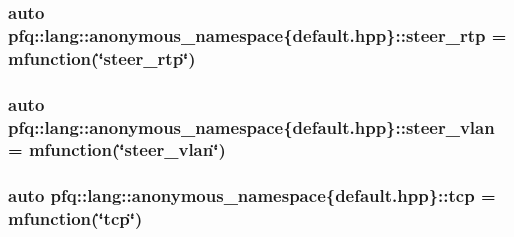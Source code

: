 \hypertarget{namespacepfq_1_1lang_1_1anonymous__namespace_02default_8hpp_03_ac3bc5ec07d93fa5d9266e0e08191fe22}{
\subsubsection[{steer\+\_\+rtp}]{\setlength{\rightskip}{0pt plus 5cm}auto pfq\+::lang\+::anonymous\+\_\+namespace\{default.\+hpp\}\+::steer\+\_\+rtp = {\bf mfunction}(\char`\"{}steer\+\_\+rtp\char`\"{})}}\label{namespacepfq_1_1lang_1_1anonymous__namespace_02default_8hpp_03_ac3bc5ec07d93fa5d9266e0e08191fe22}
\hypertarget{namespacepfq_1_1lang_1_1anonymous__namespace_02default_8hpp_03_a2c6a8ad5a3ae8b60a6a3d18a510f22ac}{
\subsubsection[{steer\+\_\+vlan}]{\setlength{\rightskip}{0pt plus 5cm}auto pfq\+::lang\+::anonymous\+\_\+namespace\{default.\+hpp\}\+::steer\+\_\+vlan = {\bf mfunction}(\char`\"{}steer\+\_\+vlan\char`\"{})}}\label{namespacepfq_1_1lang_1_1anonymous__namespace_02default_8hpp_03_a2c6a8ad5a3ae8b60a6a3d18a510f22ac}
\hypertarget{namespacepfq_1_1lang_1_1anonymous__namespace_02default_8hpp_03_a5b8ca91a33a120e7e0807e63c8b51b28}{
\subsubsection[{tcp}]{\setlength{\rightskip}{0pt plus 5cm}auto pfq\+::lang\+::anonymous\+\_\+namespace\{default.\+hpp\}\+::tcp = {\bf mfunction}(\char`\"{}tcp\char`\"{})}}\label{namespacepfq_1_1lang_1_1anonymous__namespace_02default_8hpp_03_a5b8ca91a33a120e7e0807e63c8b51b28}
